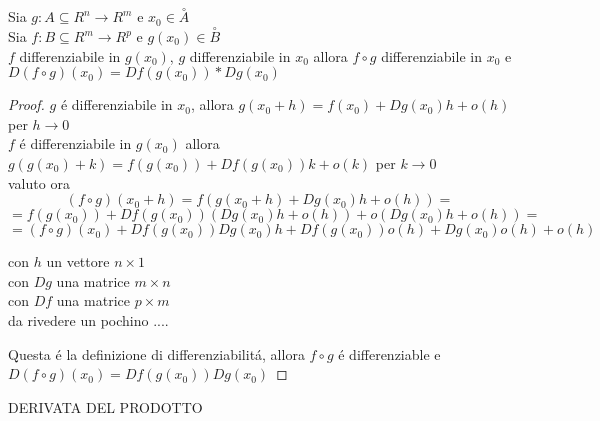 \proposition
Sia $g: A\subseteq R^n \rightarrow R^m$ e $x_0\in\overset{\circ}{A}$\\
Sia $f: B\subseteq R^m \rightarrow R^p$ e $g(x_0)\in\overset{\circ}{B}$\\
$f$ differenziabile in $g(x_0)$, $g$ differenziabile in $x_0$ allora $f\circ g$ differenziabile in $x_0$ e $D(f\circ g)(x_0) = Df(g(x_0))*Dg(x_0)$
\begin{proof}
	$g$ \'e differenziabile in $x_0$, allora $g(x_0+h)=f(x_0)+Dg(x_0)h+o(h)$ per $h\rightarrow 0$\\
	$f$ \'e differenziabile in $g(x_0)$ allora $g(g(x_0)+k)=f(g(x_0))+Df(g(x_0))k+o(k)$ per $k\rightarrow 0$\\
	valuto ora 
	$$(f\circ g)(x_0+h) = f(g(x_0+h)+Dg(x_0)h+o(h)) = $$ 
	$$=f(g(x_0))+Df(g(x_0))(Dg(x_0)h+o(h))+o(Dg(x_0)h+o(h)) = $$
	$$=(f\circ g)(x_0) + Df(g(x_0))Dg(x_0)h+Df(g(x_0))o(h)+Dg(x_0)o(h)+o(h)$$
	
	con $h$ un vettore $n\times 1$\\
	con $Dg$ una matrice $m\times n$\\
	con $Df$ una matrice $p\times m$\\
	
	da rivedere un pochino ....
	
	Questa \'e la definizione di differenziabilit\'a, allora $f\circ g$ \'e differenziable e $D(f\circ g)(x_0) = Df(g(x_0))Dg(x_0)$
\end{proof}
\proposition DERIVATA DEL PRODOTTO

